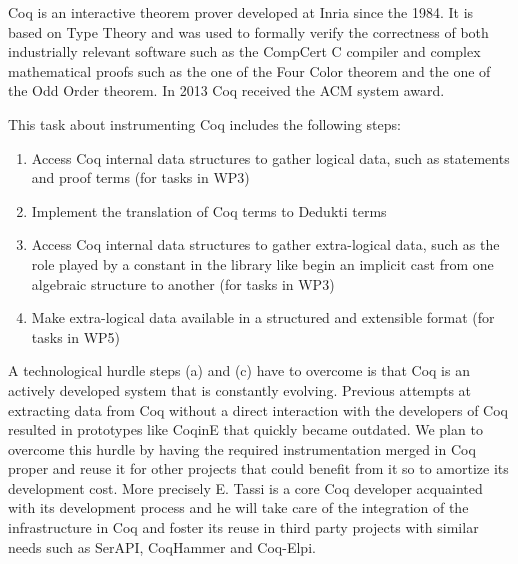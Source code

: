 

Coq is an interactive theorem prover developed at Inria since the 1984.
It is based on Type Theory and was used to formally verify the correctness
of both industrially relevant software such as the CompCert C compiler and
complex mathematical proofs such as the one of the Four Color theorem and the
one of the Odd Order theorem. In 2013 Coq received the ACM system award.

This task about instrumenting Coq includes the following steps:
\begin{enumerate}
\item Access Coq internal data structures to gather logical data, such as
statements and proof terms (for tasks in WP3)
\item Implement the translation of Coq terms to Dedukti terms
\item Access Coq internal data structures to gather extra-logical data,
such as the role played by a constant in the library like begin an implicit
cast from one algebraic structure to another (for tasks in WP3)
\item Make extra-logical data available in a structured and
  extensible format (for tasks in WP5)
\end{enumerate}

A technological hurdle steps (a) and (c) have to overcome is that Coq is an actively
developed system that is constantly evolving. Previous attempts at extracting
data from Coq without a direct interaction with the developers of Coq resulted
in prototypes like CoqinE that quickly became outdated. We plan to overcome
this hurdle by having the required instrumentation merged in Coq proper and
reuse it for other projects that could benefit from it so to amortize its
development cost. More precisely E. Tassi
is a core Coq developer acquainted with its development process and he will take
care of the integration of the infrastructure in Coq and foster its reuse in
third party projects with similar needs such as SerAPI, CoqHammer and Coq-Elpi.

